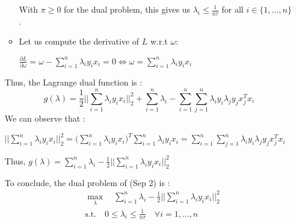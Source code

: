 \documentclass{article}
\begin{document}
\begin{itemize}
\begin{itemize}
            With $\pi \geq 0$ for the dual problem, this gives us $\lambda_i\leq\frac{1}{n\tau}$ for all $i\in \{1, \dots, n\}$.

            
            \item Let us compute the derivative of $L$ w.r.t $\omega$:

            $\frac{\partial L}{\partial \omega} = \omega-\sum_{i=1}^n\lambda_iy_ix_i=0 \Leftrightarrow \omega=\sum_{i=1}^n\lambda_iy_ix_i$
        \end{itemize}

        Thus, the Lagrange dual function is :
        \begin{equation}
            g(\lambda)=\frac{1}{2}\bigg|\bigg|\sum_{i=1}^n\lambda_iy_ix_i\bigg|\bigg|_2^2+\sum_{i=1}^n\lambda_i-\sum_{i=1}^n\sum_{j=1}^n\lambda_iy_i\lambda_jy_jx_j^Tx_i
        \end{equation}
        We can observe that :
        
        $\bigg|\bigg|\sum_{i=1}^n\lambda_iy_ix_i\bigg|\bigg|_2^2 = \bigg(\sum_{i=1}^n\lambda_iy_ix_i\bigg)^T\sum_{i=1}^n\lambda_iy_ix_i = \sum_{i=1}^n\sum_{j=1}^n\lambda_iy_i\lambda_jy_jx_j^Tx_i$

        Thus, $g(\lambda)=\sum_{i=1}^n\lambda_i-\frac{1}{2}\bigg|\bigg|\sum_{i=1}^n\lambda_iy_ix_i\bigg|\bigg|_2^2$

        To conclude, the dual problem of (Sep 2) is :
        \begin{equation}
            \begin{aligned}
                &\max_\lambda \quad \sum_{i=1}^n\lambda_i-\frac{1}{2}\bigg|\bigg|\sum_{i=1}^n\lambda_iy_ix_i\bigg|\bigg|_2^2 \\
                &\text{s.t.} \quad 0\leq\lambda_i\leq\frac{1}{n\tau}\quad \forall i=1,\dots, n
            \end{aligned}
        \end{equation}
    \end{itemize}
\end{document}
